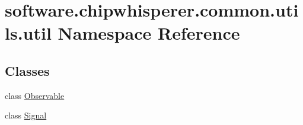 \hypertarget{namespacesoftware_1_1chipwhisperer_1_1common_1_1utils_1_1util}{}\section{software.\+chipwhisperer.\+common.\+utils.\+util Namespace Reference}
\label{namespacesoftware_1_1chipwhisperer_1_1common_1_1utils_1_1util}
\subsection*{Classes}
\begin{DoxyCompactItemize}
\item 
class \hyperlink{classsoftware_1_1chipwhisperer_1_1common_1_1utils_1_1util_1_1Observable}{Observable}
\item 
class \hyperlink{classsoftware_1_1chipwhisperer_1_1common_1_1utils_1_1util_1_1Signal}{Signal}
\end{DoxyCompactItemize}

